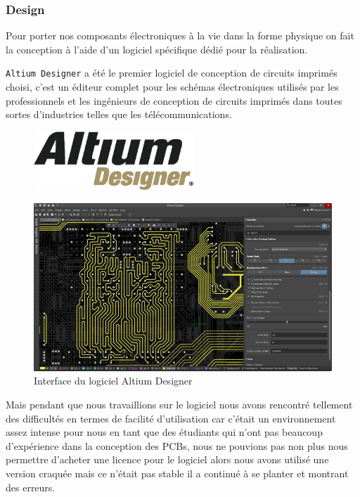 \FloatBarrier

\subsubsection{Design}
Pour porter nos composants électroniques à la vie dans la forme physique on fait la conception à l’aide d’un logiciel spécifique dédié pour la réalisation.

\verb|Altium Designer| a été le premier logiciel de conception de circuits imprimés choisi, c’est un éditeur complet pour les schémas électroniques utilisés par les professionnels et les ingénieurs de conception de circuits imprimés dans toutes sortes d’industries telles que les télécommunications.

\vspace{1cm}

\begin{figure}[!htbp]
    \centering
    \includegraphics[width=6cm]{assets/conception1/img19.jpg}
\end{figure}


\begin{figure}[!htbp]
    \centering
    \includegraphics[width=.8\textwidth]{assets/conception1/img21.jpg}
    \caption{Interface du logiciel Altium Designer}
\end{figure}

\FloatBarrier

Mais pendant que nous travaillions sur le logiciel nous avons rencontré tellement des difficultés en termes de facilité d’utilisation car c’était un environnement assez intense pour nous en tant que des étudiants qui n’ont pas beaucoup d’expérience dans la conception des PCBs, nous ne pouvions pas non plus nous permettre d’acheter une licence pour le logiciel alors nous avons utilisé une version craquée mais ce n’était pas stable il a continué à se planter et montrant des erreurs.

